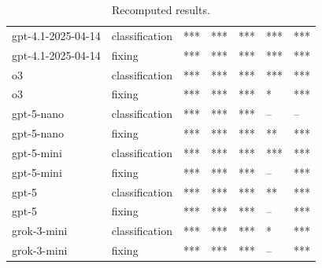 \begin{table}[!t]
\begin{tabular}{lllllll}
gpt-4.1-2025-04-14 & classification & *** & *** & *** & *** & *** \\
gpt-4.1-2025-04-14 & fixing & *** & *** & *** & *** & *** \\
o3 & classification & *** & *** & *** & *** & *** \\
o3 & fixing & *** & *** & *** & * & *** \\
gpt-5-nano & classification & *** & *** & *** & -- & -- \\
gpt-5-nano & fixing & *** & *** & *** & ** & *** \\
gpt-5-mini & classification & *** & *** & *** & *** & *** \\
gpt-5-mini & fixing & *** & *** & *** & -- & *** \\
gpt-5 & classification & *** & *** & *** & ** & *** \\
gpt-5 & fixing & *** & *** & *** & -- & *** \\
grok-3-mini & classification & *** & *** & *** & * & *** \\
grok-3-mini & fixing & *** & *** & *** & -- & *** \\
\bottomrule
\end{tabular}
\caption{Recomputed results.}
\label{tab:p-value_prompting}
\end{table}
